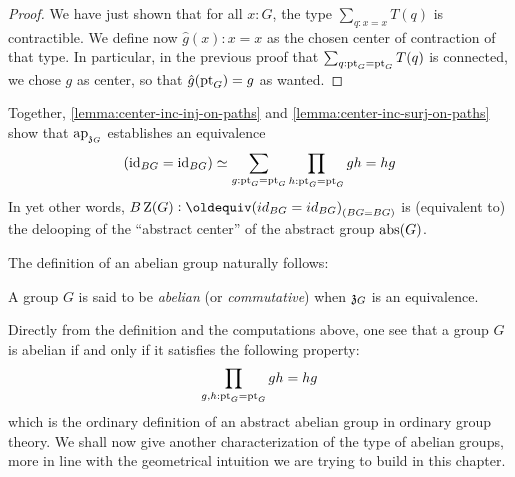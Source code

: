 \begin{proof}
  We have just shown that for all $x:G$, the type $\sum_{q:x=x}T(q)$
  is contractible. We define now $\hat g(x):x=x$ as the chosen center
  of contraction of that type. In particular, in the previous proof
  that $\sum_{q:\mathrm{pt}_G=\mathrm{pt}_G}T(q)$ is connected, we chose $g$ as
  center, so that $\hat g (\mathrm{pt}_G) = g$ as wanted.
\end{proof}

Together, \cref{lemma:center-inc-inj-on-paths} and
\cref{lemma:center-inc-surj-on-paths} show that $\mathop{\mathrm{ap}_{\mathfrak z_{{G}}}}$
establishes an equivalence
\begin{equation}
  \left( \mathord{\mathrm{id}}_{BG} = \mathord{\mathrm{id}}_{BG} \right) \simeq \sum_{g:\mathrm{pt}_G=\mathrm{pt}_G}\prod_{h:\mathrm{pt}_G=\mathrm{pt}_G}gh=hg
\end{equation}
In yet other words,
$B\grpcenter(G)\defequi \conncomp{(id_{BG}=id_{BG})}{BG=BG}$ is
(equivalent to) the delooping of the ``abstract center'' of the
abstract group $\mathrm{abs}(G)$.

The definition of an abelian group naturally follows:
\begin{definition}
  \label{def:abelian-groups}%
  A group $G$ is said to be {\em abelian} (or {\em commutative}) when
  $\mathfrak z_{{G}}$ is an equivalence.
\end{definition}

Directly from the definition and the computations above, one see that
a group $G$ is abelian if and only if it satisfies the following
property:
\begin{displaymath}
  \prod_{g,h:\mathrm{pt}_G=\mathrm{pt}_G}gh=hg
\end{displaymath}
which is the ordinary definition of an abstract abelian group in
ordinary group theory. We shall now give another characterization of
the type of abelian groups, more in line with the geometrical
intuition we are trying to build in this chapter.

